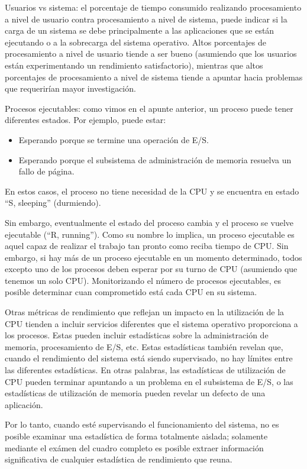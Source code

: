 \documentclass[12pt]{article}
\begin{document}
Usuarios vs sistema: el porcentaje de tiempo consumido realizando 
procesamiento a nivel de usuario contra procesamiento a nivel de sistema, 
puede indicar si la carga de un sistema se debe principalmente a las 
aplicaciones que se están ejecutando o a la sobrecarga del sistema 
operativo. Altos porcentajes de procesamiento a nivel de usuario tiende a 
ser bueno (asumiendo que los usuarios están experimentando un rendimiento
satisfactorio), mientras que altos porcentajes de procesamiento a nivel de 
sistema tiende a apuntar hacia problemas que requerirían mayor 
investigación.

Procesos ejecutables: como vimos en el apunte anterior, un proceso puede 
tener diferentes estados. Por ejemplo, puede estar:
\begin{itemize}
\item Esperando porque se termine una operación de E/S.
\item Esperando porque el subsistema de administración de memoria 
resuelva un fallo de página.
\end{itemize}
En estos casos, el proceso no tiene necesidad de la CPU y se encuentra en
estado ``S, sleeping'' (durmiendo).  

Sin embargo, eventualmente el estado del proceso cambia y el proceso se 
vuelve ejecutable (``R, running''). Como su nombre lo implica, un proceso 
ejecutable es aquel capaz de realizar el trabajo tan pronto como reciba 
tiempo de CPU. Sin embargo, si hay más de un proceso ejecutable en un 
momento determinado, todos excepto uno de los procesos deben esperar por su 
turno de CPU (asumiendo que tenemos un solo CPU). Monitorizando el
número de procesos ejecutables, es posible determinar cuan comprometido 
está cada CPU en su sistema.

Otras métricas de rendimiento que reflejan un impacto en la utilización 
de la CPU tienden a incluir servicios diferentes que el sistema operativo 
proporciona a los procesos. Estas pueden incluir estadísticas sobre la 
administración de memoria, procesamiento de E/S, etc. Estas estadísticas 
también revelan que, cuando el rendimiento del sistema está siendo 
supervisado, no hay límites entre las diferentes estadísticas. En otras 
palabras, las estadísticas de utilización de CPU pueden terminar apuntando 
a un problema en el subsistema de E/S, o las estadísticas de utilización 
de memoria pueden revelar un defecto de una aplicación.

Por lo tanto, cuando esté supervisando el funcionamiento del sistema, no 
es posible examinar una estadística de forma totalmente aislada; solamente
mediante el exámen del cuadro completo es posible extraer información 
significativa de cualquier estadística de rendimiento que reuna.
\end{document}
